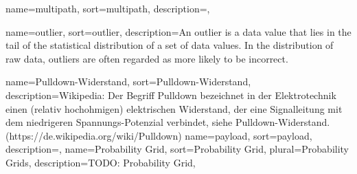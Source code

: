 
{
	name={multipath}, sort={multipath},
	description={},
}


{
	name={outlier}, sort={outlier},
	description={An outlier is a data value that lies in the tail of the statistical distribution of a set of data values. In the distribution of raw data, outliers are often regarded as more likely to be incorrect.}
} %

{
	name={Pulldown-Widerstand},
	sort={Pulldown-Widerstand},
	description={Wikipedia: Der Begriff Pulldown bezeichnet in der Elektrotechnik einen (relativ hochohmigen) elektrischen Widerstand, der eine Signalleitung mit dem niedrigeren Spannungs-Potenzial verbindet, siehe Pulldown-Widerstand. (https://de.wikipedia.org/wiki/Pulldown)}
}
{
	name={payload}, sort={payload},
	description={},
}
{
	name={Probability Grid}, sort={Probability Grid}, plural={Probability Grids},
	description={TODO: Probability Grid},
}

